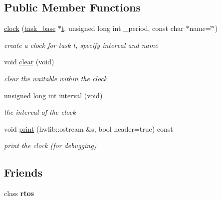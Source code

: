 \subsection*{Public Member Functions}
\begin{DoxyCompactItemize}
\item 
\hyperlink{classrtos_1_1clock_a90279f3e878dbe768e2d98e8ab77be11}{clock} (\hyperlink{classrtos_1_1task__base}{task\+\_\+base} $\ast$\hyperlink{classrtos_1_1event_aa83745aabc941145f00386fd63f6b557}{t}, unsigned long int \+\_\+period, const char $\ast$name=\char`\"{}\char`\"{})
\begin{DoxyCompactList}\small\item\em create a clock for task t, specify interval and name \end{DoxyCompactList}\item 
void \hyperlink{classrtos_1_1clock_aa90115db325c074071ae956cb101f046}{clear} (void)
\begin{DoxyCompactList}\small\item\em clear the waitable within the clock \end{DoxyCompactList}\item 
unsigned long int \hyperlink{classrtos_1_1clock_a651c02bc336ba64ac3d2b261f0a31942}{interval} (void)\hypertarget{classrtos_1_1clock_a651c02bc336ba64ac3d2b261f0a31942}{}\label{classrtos_1_1clock_a651c02bc336ba64ac3d2b261f0a31942}

\begin{DoxyCompactList}\small\item\em the interval of the clock \end{DoxyCompactList}\item 
void \hyperlink{classrtos_1_1clock_a2b61cfa27fc686915fa51fc6d7444231}{print} (hwlib\+::ostream \&s, bool header=true) const \hypertarget{classrtos_1_1clock_a2b61cfa27fc686915fa51fc6d7444231}{}\label{classrtos_1_1clock_a2b61cfa27fc686915fa51fc6d7444231}

\begin{DoxyCompactList}\small\item\em print the clock (for debugging) \end{DoxyCompactList}\end{DoxyCompactItemize}
\subsection*{Friends}
\begin{DoxyCompactItemize}
\item 
class {\bfseries rtos}\hypertarget{classrtos_1_1clock_a2a7bcfc34141352757ad672e3ecd099f}{}\label{classrtos_1_1clock_a2a7bcfc34141352757ad672e3ecd099f}

\end{DoxyCompactItemize}
